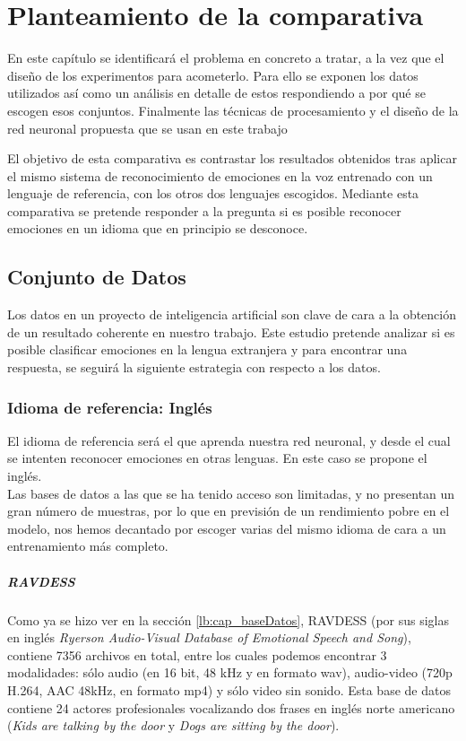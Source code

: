 \documentclass[11pt,a4paper,spanish]{book}
\begin{document}
	\chapter{Planteamiento de la comparativa}
	
	En este capítulo se identificará el problema en concreto a tratar, a la vez que el diseño de los experimentos para acometerlo. Para ello se exponen los datos utilizados así como un análisis en detalle de estos respondiendo a por qué se escogen esos conjuntos. Finalmente las técnicas de procesamiento y el diseño de la red neuronal propuesta que se usan en este trabajo
	
	El objetivo de esta comparativa es contrastar los resultados obtenidos tras aplicar el mismo sistema de reconocimiento de emociones en la voz entrenado con un lenguaje de referencia, con los otros dos lenguajes escogidos. Mediante esta comparativa se pretende responder a la pregunta si es posible reconocer emociones en un idioma que en principio se desconoce.
	
	\section{Conjunto de Datos}
	\label{lb_c4_datos}
	Los datos en un proyecto de inteligencia artificial son clave de cara a la obtención de un resultado coherente en nuestro trabajo. Este estudio pretende analizar si es posible clasificar emociones en la lengua extranjera y para encontrar una respuesta, se seguirá la siguiente estrategia con respecto a los datos.
	
	\subsection{Idioma de referencia: Inglés} El idioma de referencia será el que aprenda nuestra red neuronal, y desde el cual se intenten reconocer emociones en otras lenguas. En este caso se propone el inglés.\\
	Las bases de datos a las que se ha tenido acceso son limitadas, y no presentan un gran número de muestras, por lo que en previsión de un rendimiento pobre en el modelo, nos hemos decantado por escoger varias del mismo idioma de cara a un entrenamiento más completo.
	
	\paragraph{RAVDESS}
	Como ya se hizo ver en la sección \ref{lb:cap_baseDatos}, RAVDESS (por sus siglas en inglés \emph{Ryerson Audio-Visual Database of Emotional Speech and Song}), contiene 7356 archivos en total, entre los cuales podemos encontrar 3 modalidades: sólo audio (en 16 bit, 48 kHz y en formato wav), audio-video (720p H.264, AAC 48kHz, en formato mp4) y sólo video sin sonido. Esta base de datos contiene 24 actores profesionales vocalizando dos frases en inglés norte americano (\emph{Kids are talking by the door} y \emph{Dogs are sitting by the door}).
	
\end{document}
